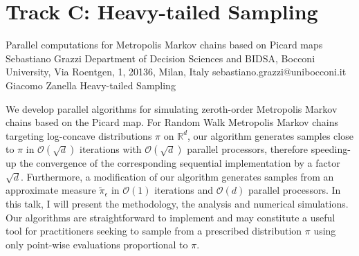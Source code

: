 \section{Track C: Heavy-tailed Sampling}\newpage

\begin{talk}
  {Parallel computations for Metropolis Markov chains based on Picard maps}%
  {Sebastiano Grazzi}%
  {Department of Decision Sciences and BIDSA, Bocconi University, Via Roentgen, 1, 20136, Milan, Italy}%
  {sebastiano.grazzi@unibocconi.it}%
  {Giacomo Zanella}%
  {Heavy-tailed Sampling}%
    
   

 We develop parallel algorithms for simulating zeroth-order Metropolis Markov chains based on the Picard map. 
For Random Walk Metropolis Markov chains targeting log-concave distributions $\pi$ on $\mathbb{R}^d$, our algorithm  
generates samples %
close to $\pi$ %
in $\mathcal{O}(\sqrt{d})$ iterations with $\mathcal{O}(\sqrt{d})$ parallel processors, 
therefore speeding-up the convergence of the corresponding sequential implementation by a factor $\sqrt{d}$. Furthermore, a modification of our algorithm generates samples from an approximate measure $\tilde \pi_\epsilon$ in $\mathcal{O}(1)$ iterations and $\mathcal{O}(d)$ parallel processors. In this talk, I will present the methodology, the analysis and numerical simulations. Our algorithms are straightforward to implement and may constitute a useful tool for practitioners seeking to sample from a prescribed distribution $\pi$ using only point-wise evaluations proportional to $\pi$.
\end{talk}

